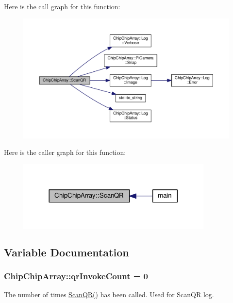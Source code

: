 Here is the call graph for this function\+:
\nopagebreak
\begin{figure}[H]
\begin{center}
\leavevmode
\includegraphics[width=350pt]{namespaceChipChipArray_a6c7465049b5d408e1a238b6d8ffa887d_cgraph}
\end{center}
\end{figure}




Here is the caller graph for this function\+:
\nopagebreak
\begin{figure}[H]
\begin{center}
\leavevmode
\includegraphics[width=278pt]{namespaceChipChipArray_a6c7465049b5d408e1a238b6d8ffa887d_icgraph}
\end{center}
\end{figure}




\subsection{Variable Documentation}
\hypertarget{namespaceChipChipArray_a3b2a3c0ffa9f53021293aeb4955d2fef}{
\subsubsection[{qr\+Invoke\+Count}]{ Chip\+Chip\+Array\+::qr\+Invoke\+Count = 0}}\label{namespaceChipChipArray_a3b2a3c0ffa9f53021293aeb4955d2fef}
The number of times \hyperlink{namespaceChipChipArray_a6c7465049b5d408e1a238b6d8ffa887d}{Scan\+Q\+R()} has been called. Used for Scan\+Q\+R log. 

